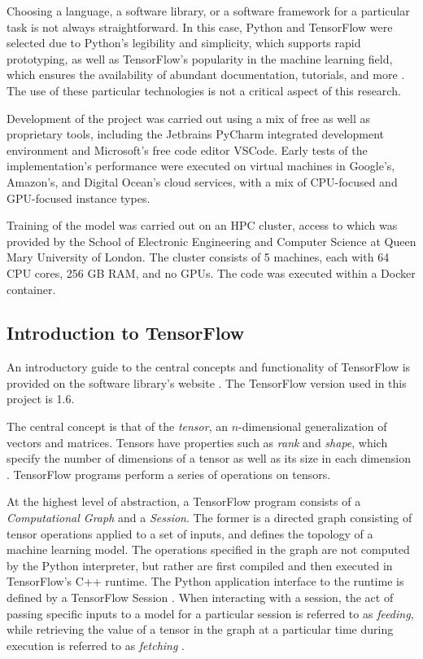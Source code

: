 \documentclass[12pt, titlepage]{report}
\theoremstyle{definition}
\begin{document}
Choosing a language, a software library, or a software framework for a particular task is not always straightforward. In this case, Python and TensorFlow were selected due to Python's legibility and simplicity, which supports rapid prototyping, as well as TensorFlow's popularity in the machine learning field, which ensures the availability of abundant documentation, tutorials, and more \cite{bhatia2017why}. The use of these particular technologies is not a critical aspect of this research.

Development of the project was carried out using a mix of free as well as proprietary tools, including the Jetbrains PyCharm integrated development environment and Microsoft's free code editor VSCode. Early tests of the implementation's performance were executed on virtual machines in Google's, Amazon's, and Digital Ocean's cloud services, with a mix of CPU-focused and GPU-focused instance types.

Training of the model was carried out on an HPC cluster, access to which was provided by the School of Electronic Engineering and Computer Science at Queen Mary University of London. The cluster consists of 5 machines, each with 64 CPU cores, 256 GB RAM, and no GPUs. The code was executed within a Docker container.


\subsection{Introduction to TensorFlow}
An introductory guide to the central concepts and functionality of TensorFlow is provided on the software library's website \cite{tensorflow2018intro}. The TensorFlow version used in this project is 1.6.

The central concept is that of the \textit{tensor}, an $n$-dimensional generalization of vectors and matrices. Tensors have properties such as \textit{rank} and \textit{shape}, which specify the number of dimensions of a tensor as well as its size in each dimension \cite{tensorflow2018intro}. TensorFlow programs perform a series of operations on tensors.

At the highest level of abstraction, a TensorFlow program consists of a \textit{Computational Graph} and a \textit{Session}. The former is a directed graph consisting of tensor operations applied to a set of inputs, and defines the topology of a machine learning model. The operations specified in the graph are not computed by the Python interpreter, but rather are first compiled and then executed in TensorFlow's C++ runtime. The Python application interface to the runtime is defined by a TensorFlow Session \cite{tensorflow2018graphs}. When interacting with a session, the act of passing specific inputs to a model for a particular session is referred to as \textit{feeding}, while retrieving the value of a tensor in the graph at a particular time during execution is referred to as \textit{fetching} \cite{tensorflow2018intro}.
\end{document}
